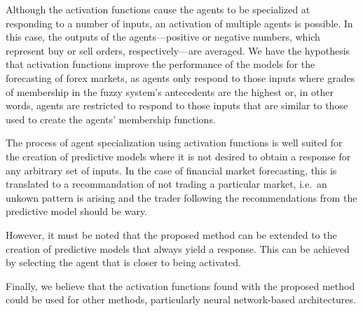 ﻿\documentclass{ieeeaccess}
\begin{document}
Although the activation functions cause the agents to be specialized at
responding to a number of inputs, an activation of multiple agents is
possible. %
In this case, the outputs of the agents---positive or negative
numbers, which represent buy or sell orders, respectively---are
averaged. We have the hypothesis that activation functions improve the
performance of the models for the forecasting of forex markets, as
agents only respond to those inputs where grades of membership in the
fuzzy system's antecedents are the highest or, in other words, agents
are restricted to respond to those inputs that are similar to those used
to create the agents' membership functions.


The process of agent specialization using activation functions is well suited
for the creation of predictive models where it is not desired to obtain a
response for any arbitrary set of inputs. In the case of financial market
forecasting, this is translated to a recommandation of not trading a
particular market, i.e.\ an unkown pattern is arising and the trader following
the recommendations from the predictive model should be wary.

However, it must be noted that the proposed method can be extended to the
creation of predictive models that always yield a response. This can be
achieved by selecting the agent that is closer to being activated.

Finally, we believe that the activation functions found with the
proposed method could be used for other methods, particularly neural
network-based architectures.

\end{document}
